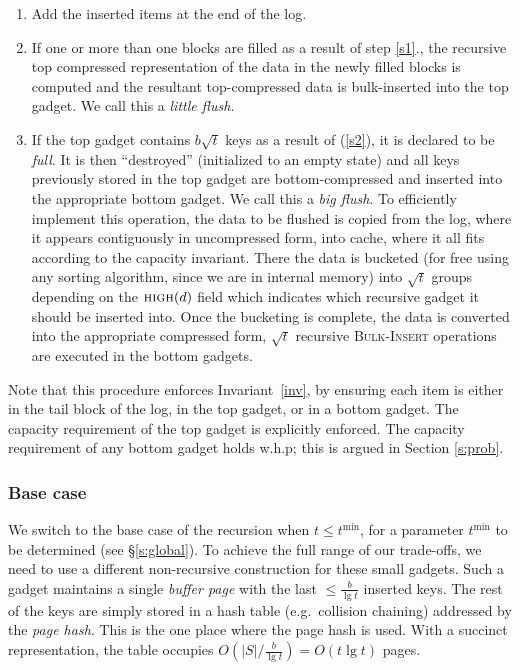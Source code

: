 \documentclass[letterpaper,11pt]{article}
\newcommand{\proc}[1]{\textnormal{\scshape#1}}
\newcommand{\tmin}{t^{\min}}
\newcommand{\MSB}{\proc{high}}
\begin{document}
\begin{enumerate}
\item Add the inserted items at the end of the log. \label{s1}

\item If one or more than one blocks are filled as a result of step
  \ref{s1}., the recursive top compressed representation of the data
  in the newly filled blocks is computed and the resultant
  top-compressed data is bulk-inserted into the top gadget. We call
  this a \emph{little flush}. \label{s2}

\item If the top gadget contains $b \sqrt{t}$ keys as a result of
  (\ref{s2}), it is declared to be \emph{full}. It is then
  ``destroyed'' (initialized to an empty state) and all keys
  previously stored in the top gadget are bottom-compressed and
  inserted into the appropriate bottom gadget. We call this a
  \emph{big flush}. To efficiently implement this operation, the data
  to be flushed is copied from the log, where it appears contiguously
  in uncompressed form, into cache, where it all fits according to the
  capacity invariant. There the data is bucketed (for free using any
  sorting algorithm, since we are in internal memory) into $\sqrt{t}$
  groups depending on the $\MSB(d)$ field which indicates which
  recursive gadget it should be inserted into. Once the bucketing is
  complete, the data is converted into the appropriate compressed
  form, $\sqrt{t}$ recursive \proc{Bulk-Insert} operations are
  executed in the bottom gadgets.
\label{s3}
\end{enumerate}

Note that this procedure enforces Invariant~\ref{inv}, by ensuring
each item is either in the tail block of the log, in the top gadget,
or in a bottom gadget. The capacity requirement of the top gadget is
explicitly enforced. The capacity requirement of any bottom gadget
holds w.h.p; this is argued in Section \ref{s:prob}.




\subsubsection{Base case} \label{sec:base}
We switch to the base case of the recursion when $t\le \tmin$, for a
parameter $\tmin$ to be determined (see \S\ref{s:global}). To achieve
the full range of our trade-offs, we need to use a different
non-recursive construction for these small gadgets. Such a gadget
maintains a single \emph{buffer page} with the last $\le \frac{b}{\lg
  t}$ inserted keys.  The rest of the keys are simply stored in a hash
table (e.g.~collision chaining) addressed by the \emph{page
  hash}. This is the one place where the page hash is used. With a
succinct representation, the table occupies $O(|S| / \frac{b}{\lg t})
= O(t \lg t)$ pages.
\end{document}
